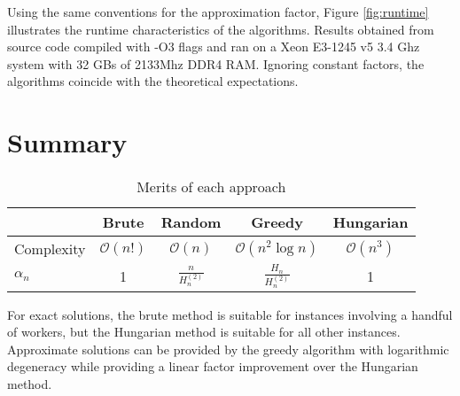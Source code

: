 \documentclass{article}
\newcommand{\boundedBy}[1]{\mathcal{O} \left ( #1 \right )}
\begin{document}
Using the same conventions for the approximation factor, Figure \ref{fig:runtime} illustrates the runtime characteristics of the algorithms. Results obtained from source code compiled with -O3 flags and ran on a Xeon E3-1245 v5 3.4 Ghz system with 32 GBs of 2133Mhz DDR4 RAM. Ignoring constant factors, the algorithms coincide with the theoretical expectations.

\section{Summary}

\begin{table}[H]
	\centering
	\begin{tabular}{l|c|c|c|c}
& Brute & Random & Greedy & Hungarian \\
\hline
Complexity & $\boundedBy{n!}$ & $\boundedBy{n}$ & $\boundedBy{n^2 \log n}$ & $\boundedBy{n^3}$ \\
$\alpha_n$ & 1 & $\frac{n}{H_n^{(2)}}$ & $\frac{H_n}{H_n^{(2)}}$ & 1
	\end{tabular}
	\caption{Merits of each approach}
\end{table}

For exact solutions, the brute method is suitable for instances involving a handful of workers, but the Hungarian method is suitable for all other instances. Approximate solutions can be provided by the greedy algorithm with logarithmic degeneracy while providing a linear factor improvement over the Hungarian method.



\end{document}
